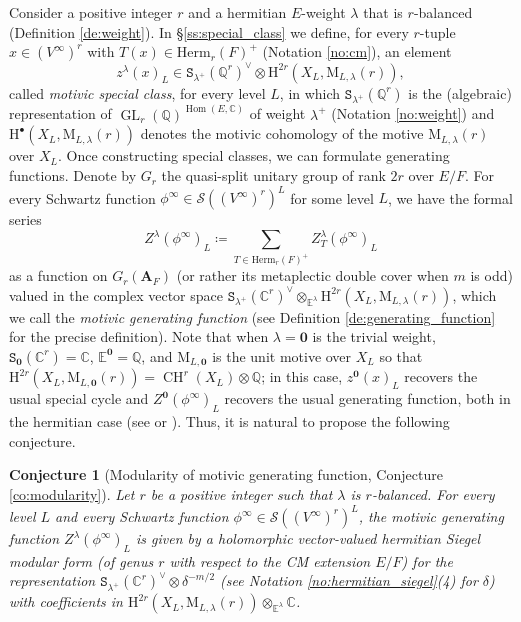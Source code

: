\documentclass[12pt]{amsart}
\numberwithin{equation}{section}
\theoremstyle{plain}
\newtheorem{conjecture}[proposition]{Conjecture}
\theoremstyle{definition}
\theoremstyle{remark}
\renewcommand{\b}[1]{\mathbf{#1}}
\renewcommand{\d}[1]{\mathbb{#1}}
\renewcommand{\r}[1]{\mathrm{#1}}
\newcommand{\s}[1]{\mathscr{#1}}
\renewcommand{\(}{\left(}
\renewcommand{\)}{\right)}
\newcommand{\bA}{\b A}
\newcommand{\dC}{\d C}
\newcommand{\dE}{\d E}
\newcommand{\dQ}{\d Q}
\newcommand{\rH}{\r H}
\newcommand{\rM}{\r M}
\newcommand{\sS}{\s S}
\newcommand{\tS}{\mathtt{S}}
\newcommand{\Herm}{\r{Herm}}
\DeclareMathOperator{\CH}{CH}
\DeclareMathOperator{\GL}{GL}
\DeclareMathOperator{\Hom}{Hom}
\begin{document}
Consider a positive integer $r$ and a hermitian $E$-weight $\lambda$ that is $r$-balanced (Definition \ref{de:weight}). In \S\ref{ss:special_class} we define, for every $r$-tuple $x\in(V^\infty)^r$ with $T(x)\in\Herm_r(F)^+$ (Notation \ref{no:cm}), an element
\[
z^\lambda(x)_L\in\tS_{\lambda^+}(\dQ^r)^\vee\otimes\rH^{2r}(X_L,\rM_{L,\lambda}(r)),
\]
called \emph{motivic special class}, for every level $L$, in which $\tS_{\lambda^+}(\dQ^r)$ is the (algebraic) representation of $\GL_r(\dQ)^{\Hom(E,\dC)}$ of weight $\lambda^+$ (Notation \ref{no:weight}) and $\rH^\bullet(X_L,\rM_{L,\lambda}(r))$ denotes the motivic cohomology of the motive $\rM_{L,\lambda}(r)$ over $X_L$. Once constructing special classes, we can formulate generating functions. Denote by $G_r$ the quasi-split unitary group of rank $2r$ over $E/F$. For every Schwartz function $\phi^\infty\in\sS((V^\infty)^r)^L$ for some level $L$, we have the formal series
\[
Z^\lambda(\phi^\infty)_L\coloneqq\sum_{T\in\Herm_r(F)^+}Z^\lambda_T(\phi^\infty)_L
\]
as a function on $G_r(\bA_F)$ (or rather its metaplectic double cover when $m$ is odd) valued in the complex vector space $\tS_{\lambda^+}(\dC^r)^\vee\otimes_{\dE^\lambda}\rH^{2r}(X_L,\rM_{L,\lambda}(r))$, which we call the \emph{motivic generating function} (see Definition \ref{de:generating_function} for the precise definition). Note that when $\lambda=\b{0}$ is the trivial weight, $\tS_{\b{0}}(\dC^r)=\dC$, $\dE^{\b{0}}=\dQ$, and $\rM_{L,\b{0}}$ is the unit motive over $X_L$ so that $\rH^{2r}(X_L,\rM_{L,\b{0}}(r))=\CH^r(X_L)\otimes\dQ$; in this case, $z^{\b{0}}(x)_L$ recovers the usual special cycle and $Z^{\b{0}}(\phi^\infty)_L$ recovers the usual generating function, both in the hermitian case (see \cite{Liu11} or \cite{LL21}). Thus, it is natural to propose the following conjecture.

\begin{conjecture}[Modularity of motivic generating function, Conjecture \ref{co:modularity}]
Let $r$ be a positive integer such that $\lambda$ is $r$-balanced. For every level $L$ and every Schwartz function $\phi^\infty\in\sS((V^\infty)^r)^L$, the motivic generating function $Z^\lambda(\phi^\infty)_L$ is given by a holomorphic vector-valued hermitian Siegel modular form (of genus $r$ with respect to the CM extension $E/F$) for the representation $\tS_{\lambda^+}(\dC^r)^\vee\otimes\delta^{-m/2}$ (see Notation \ref{no:hermitian_siegel}(4) for $\delta$) with coefficients in $\rH^{2r}(X_L,\rM_{L,\lambda}(r))\otimes_{\dE^\lambda}\dC$.
\end{conjecture}
\end{document}
